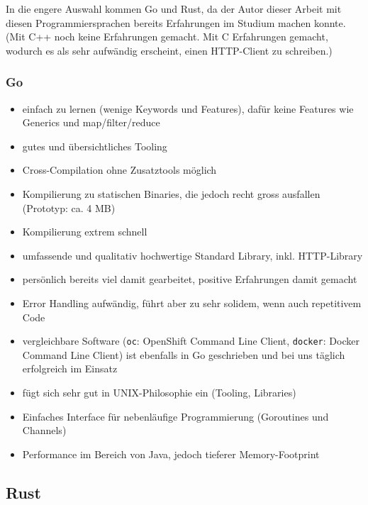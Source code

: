 In die engere Auswahl kommen Go und Rust, da der Autor dieser Arbeit mit diesen Programmiersprachen bereits Erfahrungen im Studium machen konnte. (Mit C++ noch keine Erfahrungen gemacht. Mit C Erfahrungen gemacht, wodurch es als sehr aufwändig erscheint, einen HTTP-Client zu schreiben.)

\subsubsection{Go}

\begin{itemize}
    \item einfach zu lernen (wenige Keywords und Features), dafür keine Features wie Generics und map/filter/reduce
    \item gutes und übersichtliches Tooling
    \item Cross-Compilation ohne Zusatztools möglich
    \item Kompilierung zu statischen Binaries, die jedoch recht gross ausfallen (Prototyp: ca. 4 MB)
    \item Kompilierung extrem schnell
    \item umfassende und qualitativ hochwertige Standard Library, inkl. HTTP-Library
    \item persönlich bereits viel damit gearbeitet, positive Erfahrungen damit gemacht
    \item Error Handling aufwändig, führt aber zu sehr solidem, wenn auch repetitivem Code
    \item vergleichbare Software (\texttt{oc}: OpenShift Command Line Client, \texttt{docker}: Docker Command Line Client) ist ebenfalls in Go geschrieben und bei uns täglich erfolgreich im Einsatz
    \item fügt sich sehr gut in UNIX-Philosophie ein (Tooling, Libraries)
    \item Einfaches Interface für nebenläufige Programmierung (Goroutines und Channels)
    \item Performance im Bereich von Java, jedoch tieferer Memory-Footprint
\end{itemize}

\subsection{Rust}

